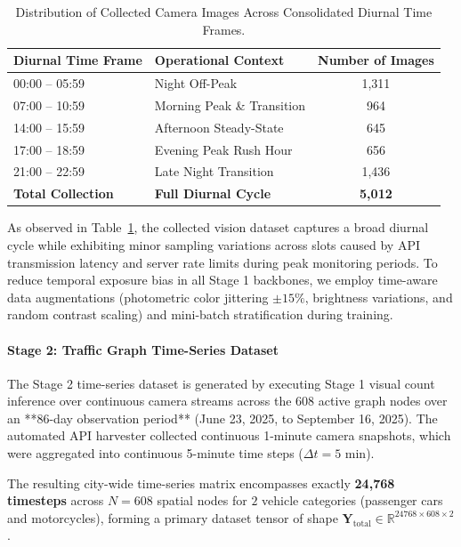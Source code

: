 \documentclass[a4paper,fleqn]{cas-sc}
\begin{document}
\begin{table}[pos=htbp]
    \centering
\footnotesize
\setlength{\tabcolsep}{6pt}
\renewcommand{\arraystretch}{1.15}
    \caption{Distribution of Collected Camera Images Across Consolidated Diurnal Time Frames.}
    \label{tab:time_distribution}
    \begin{tabular}{llc}
        \toprule
        \textbf{Diurnal Time Frame} & \textbf{Operational Context} & \textbf{Number of Images} \\
        \midrule
        00:00 -- 05:59 & Night Off-Peak & 1,311 \\
        07:00 -- 10:59 & Morning Peak \& Transition & 964 \\
        14:00 -- 15:59 & Afternoon Steady-State & 645 \\
        17:00 -- 18:59 & Evening Peak Rush Hour & 656 \\
        21:00 -- 22:59 & Late Night Transition & 1,436 \\
        \midrule
        \textbf{Total Collection} & \textbf{Full Diurnal Cycle} & \textbf{5,012} \\
        \bottomrule
    \end{tabular}
\end{table}

As observed in Table~\ref{tab:time_distribution}, the collected vision dataset captures a broad diurnal cycle while exhibiting minor sampling variations across slots caused by API transmission latency and server rate limits during peak monitoring periods. To reduce temporal exposure bias in all Stage 1 backbones, we employ time-aware data augmentations (photometric color jittering $\pm 15\%$, brightness variations, and random contrast scaling) and mini-batch stratification during training.

\paragraph{Stage 2: Traffic Graph Time-Series Dataset}
The Stage 2 time-series dataset is generated by executing Stage 1 visual count inference over continuous camera streams across the 608 active graph nodes over an **86-day observation period** (June 23, 2025, to September 16, 2025). The automated API harvester collected continuous 1-minute camera snapshots, which were aggregated into continuous 5-minute time steps ($\Delta t = 5$ min).

The resulting city-wide time-series matrix encompasses exactly \textbf{24,768 timesteps} across $N=608$ spatial nodes for $2$ vehicle categories (passenger cars and motorcycles), forming a primary dataset tensor of shape $\mathbf{Y}_{\text{total}} \in \mathbb{R}^{24768 \times 608 \times 2}$. 
\end{document}
